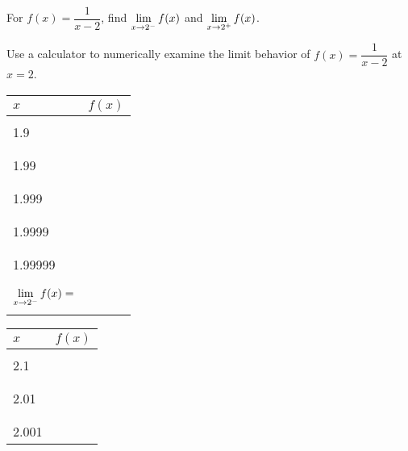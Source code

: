 \documentclass[notes]{subfiles}
\begin{document}
		\begin{ex}
			For $f(x) = \dfrac{1}{x-2}$, find $\displaystyle \lim_{x\to 2^-} f(x)$ and $\displaystyle \lim_{x\to 2^+} f(x)$.
		\end{ex}
		\begin{ex}
			$ $\\ Use a calculator to numerically examine the limit behavior of $f(x) = \dfrac{1}{x-2}$ at $x = 2$.  \\
			\begin{flushleft}
				\begin{minipage}{.4\textwidth}
				\begin{tabu}{|X[0.5,c]|X[1,c]|}\hline
						$x$ & $f(x)$ \\ \hline
							& \\
					1.9		& \\
							& \\ \hline
							& \\
					1.99	& \\
							& \\ \hline
							& \\
					1.999	& \\
							& \\ \hline
							& \\
					1.9999	& \\
							& \\ \hline
							& \\
					1.99999	& \\
							& \\ \hline\hline
							& \\
					$\displaystyle \lim_{x\to 2^-}f(x) = $ & \\
												& \\ \hline			
				\end{tabu}
				\end{minipage}
				\begin{minipage}{.4\textwidth}
				\begin{tabu}{|X[.5,c]|X[1,c]|}\hline
						$x$ & $f(x)$ \\ \hline
							& \\
					2.1		& \\
							& \\ \hline
							& \\
					2.01	& \\
							& \\ \hline
							& \\
					2.001	& \\

\end{tabu}
\end{minipage}
\end{flushleft}
\end{ex}
\end{document}
